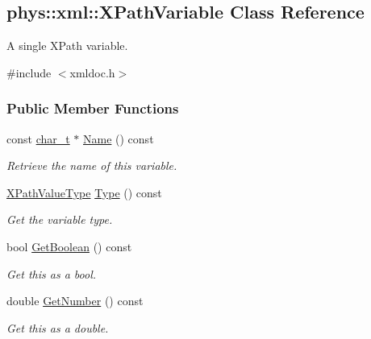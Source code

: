 \hypertarget{classphys_1_1xml_1_1XPathVariable}{
\subsection{phys::xml::XPathVariable Class Reference}
\label{classphys_1_1xml_1_1XPathVariable}
}


A single XPath variable.  




{\ttfamily \#include $<$xmldoc.h$>$}

\subsubsection*{Public Member Functions}
\begin{DoxyCompactItemize}
\item 
const \hyperlink{namespacephys_1_1xml_afc87705cd1c2917d87b879715a2d8f6e}{char\_\-t} $\ast$ \hyperlink{classphys_1_1xml_1_1XPathVariable_adeecf4d048c98de6fe7e9fcdb7174bcc}{Name} () const 
\begin{DoxyCompactList}\small\item\em Retrieve the name of this variable. \item\end{DoxyCompactList}\item 
\hyperlink{namespacephys_1_1xml_a339b9eef674ba44100110e5524bc575d}{XPathValueType} \hyperlink{classphys_1_1xml_1_1XPathVariable_a6c2986292fe674b79ea9dbf261c4a96f}{Type} () const 
\begin{DoxyCompactList}\small\item\em Get the variable type. \item\end{DoxyCompactList}\item 
bool \hyperlink{classphys_1_1xml_1_1XPathVariable_ade5e5da86817afc6fafd64d4f9b21e9c}{GetBoolean} () const 
\begin{DoxyCompactList}\small\item\em Get this as a bool. \item\end{DoxyCompactList}\item 
double \hyperlink{classphys_1_1xml_1_1XPathVariable_ac3798fc142b781c48bd694f1cdd386c4}{GetNumber} () const 
\begin{DoxyCompactList}\small\item\em Get this as a double. \item\end{DoxyCompactList}\item 

\end{DoxyCompactItemize}
